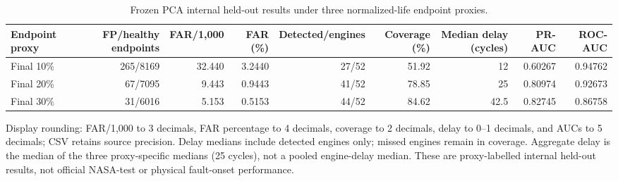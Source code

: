 \begin{table}[t]
\centering
\small
\caption{Frozen PCA internal held-out results under three normalized-life endpoint proxies.}
\label{tab:confirmatory-results}
\begin{tabular}{l r r r r r r r r}
\hline
Endpoint proxy & FP/healthy endpoints & FAR/1,000 & FAR (\%) & Detected/engines & Coverage (\%) & Median delay (cycles) & PR-AUC & ROC-AUC \\
\hline
Final 10\% & 265/8169 & 32.440 & 3.2440 & 27/52 & 51.92 & 12 & 0.60267 & 0.94762 \\
Final 20\% & 67/7095 & 9.443 & 0.9443 & 41/52 & 78.85 & 25 & 0.80974 & 0.92673 \\
Final 30\% & 31/6016 & 5.153 & 0.5153 & 44/52 & 84.62 & 42.5 & 0.82745 & 0.86758 \\
\hline
\end{tabular}
\vspace{0.5ex}
\parbox{0.98\textwidth}{\footnotesize Display rounding: FAR/1,000 to 3 decimals, FAR percentage to 4 decimals, coverage to 2 decimals, delay to 0--1 decimals, and AUCs to 5 decimals; CSV retains source precision. Delay medians include detected engines only; missed engines remain in coverage. Aggregate delay is the median of the three proxy-specific medians (25 cycles), not a pooled engine-delay median. These are proxy-labelled internal held-out results, not official NASA-test or physical fault-onset performance.}
\end{table}
